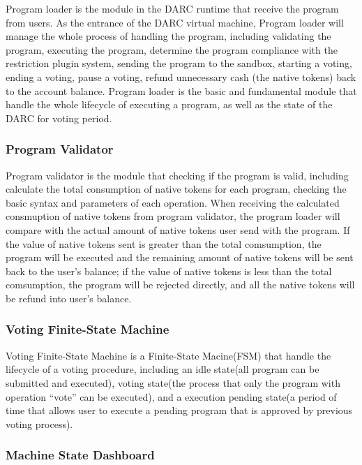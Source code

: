 \documentclass[main.tex]{subfiles}
\begin{document}
Program loader is the module in the DARC runtime that receive the program from users. As the entrance of the DARC virtual machine, Program loader will manage the whole process of handling the program, including validating the program, executing the program, determine the program compliance with the restriction plugin system, sending the program to the sandbox, starting a voting, ending a voting, pause a voting, refund unnecessary cash (the native tokens) back to the account balance. Program loader is the basic and fundamental module that handle the whole lifecycle of executing a program, as well as the state of the DARC for voting period.

\subsubsection{Program Validator}

Program validator is the module that checking if the program is valid, including calculate the total consumption of native tokens for each program, checking the basic syntax and parameters of each operation. When receiving the calculated consmuption of native tokens from program validator, the program loader will compare with the actual amount of native tokens user send with the program. If the value of native tokens sent is greater than the total comsumption, the program will be executed and the remaining amount of native tokens will be sent back to the user's balance; if the value of native tokens is less than the total comsumption, the program will be rejected directly, and all the native tokens will be refund into user's balance.

\subsubsection{Voting Finite-State Machine}

Voting Finite-State Machine is a Finite-State Macine(FSM) that handle the lifecycle of a voting procedure, including an idle state(all program can be submitted and executed), voting state(the process that only the program with operation ``vote'' can be executed), and a execution pending state(a period of time that allows user to execute a pending program that is approved by previous voting process). 

\subsubsection{Machine State Dashboard}
\end{document}

